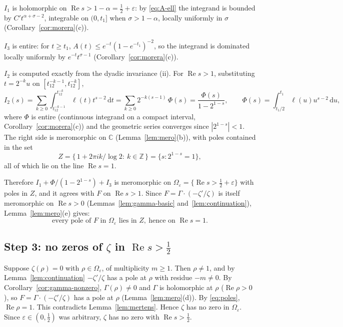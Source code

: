 \documentclass[11pt]{article}
\theoremstyle{definition}
\newcommand{\C}{\mathbb{C}}
\newcommand{\Z}{\mathbb{Z}}
\newcommand{\re}{\operatorname{Re}}
\newcommand{\dd}{\,\mathrm{d}}
\begin{document}
$I_1$ is holomorphic on $\re s>1-\alpha=\tfrac12+\varepsilon$: by \eqref{eq:A-ell} the integrand is bounded by $C't^{\alpha+\sigma-2}$, integrable on $(0,t_1]$ when $\sigma>1-\alpha$, locally uniformly in $\sigma$ (Corollary~\ref{cor:morera}(c)).

$I_3$ is entire: for $t\ge t_1$, $A(t)\le e^{-t}(1-e^{-t_1})^{-2}$, so the integrand is dominated locally uniformly by $e^{-t}t^{\sigma-1}$ (Corollary~\ref{cor:morera}(c)).

$I_2$ is computed exactly from the dyadic invariance (ii). For $\re s>1$, substituting $t=2^{-k}u$ on $[t_12^{-k-1},t_12^{-k}]$,
\[
I_2(s)=\sum_{k\ge0}\int_{t_12^{-k-1}}^{t_12^{-k}}\ell(t)t^{s-2}\dd t
=\sum_{k\ge0}2^{-k(s-1)}\,\Phi(s)
=\frac{\Phi(s)}{1-2^{1-s}},\qquad
\Phi(s)=\int_{t_1/2}^{t_1}\ell(u)u^{s-2}\dd u ,
\]
where $\Phi$ is entire (continuous integrand on a compact interval, Corollary~\ref{cor:morera}(c)) and the geometric series converges since $|2^{1-s}|<1$.
The right side is meromorphic on $\C$ (Lemma~\ref{lem:mero}(b)), with poles contained in the set
\[
Z=\{\,1+2\pi ik/\log2:\ k\in\Z\,\}=\{s:2^{1-s}=1\},
\]
all of which lie on the line $\re s=1$.

Therefore $I_1+\Phi/(1-2^{1-s})+I_3$ is meromorphic on $\Omega_\varepsilon=\{\re s>\tfrac12+\varepsilon\}$ with poles in $Z$, and it agrees with $F$ on $\re s>1$.
Since $F=\Gamma\cdot(-\zeta'/\zeta)$ is itself meromorphic on $\re s>0$ (Lemmas~\ref{lem:gamma-basic} and~\ref{lem:continuation}), Lemma~\ref{lem:mero}(e) gives:
\begin{equation}\label{eq:poles}
\text{every pole of }F\text{ in }\Omega_\varepsilon\text{ lies in }Z,\ \text{hence on }\re s=1 .
\end{equation}

\subsection*{Step 3: no zeros of $\zeta$ in $\re s>\tfrac12$}

Suppose $\zeta(\rho)=0$ with $\rho\in\Omega_\varepsilon$, of multiplicity $m\ge1$. Then $\rho\ne1$, and by Lemma~\ref{lem:continuation} $-\zeta'/\zeta$ has a pole at $\rho$ with residue $-m\ne0$.
By Corollary~\ref{cor:gamma-nonzero}, $\Gamma(\rho)\ne0$ and $\Gamma$ is holomorphic at $\rho$ ($\re\rho>0$), so $F=\Gamma\cdot(-\zeta'/\zeta)$ has a pole at $\rho$ (Lemma~\ref{lem:mero}(d)).
By \eqref{eq:poles}, $\re\rho=1$. This contradicts Lemma~\ref{lem:mertens}.
Hence $\zeta$ has no zero in $\Omega_\varepsilon$. Since $\varepsilon\in(0,\tfrac12)$ was arbitrary, $\zeta$ has no zero with $\re s>\tfrac12$.
\end{document}
